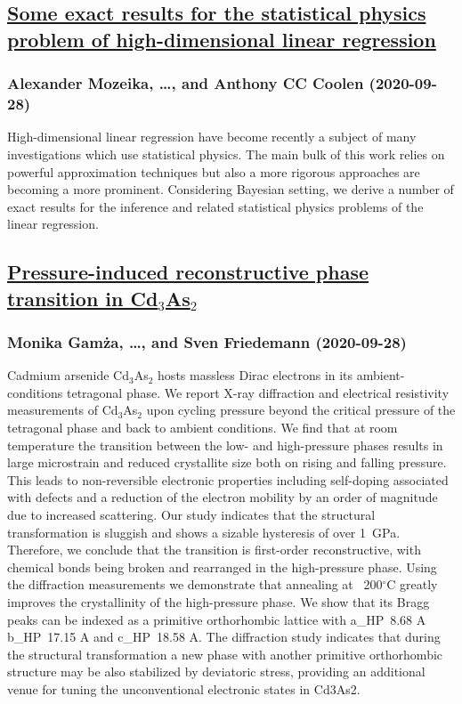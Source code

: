 \subsection*{\href{http://arxiv.org/abs/2009.13229v1}{Some exact results for the statistical physics problem of  high-dimensional linear regression}}
\subsubsection*{Alexander Mozeika, \dots, and Anthony CC Coolen (2020-09-28)}
High-dimensional linear regression have become recently a subject of many
investigations which use statistical physics. The main bulk of this work relies
on powerful approximation techniques but also a more rigorous approaches are
becoming a more prominent. Considering Bayesian setting, we derive a number of
exact results for the inference and related statistical physics problems of the
linear regression.

\subsection*{\href{http://arxiv.org/abs/2009.13228v1}{Pressure-induced reconstructive phase transition in Cd$_3$As$_2$}}
\subsubsection*{Monika Gamża, \dots, and Sven Friedemann (2020-09-28)}
Cadmium arsenide Cd$_3$As$_2$ hosts massless Dirac electrons in its
ambient-conditions tetragonal phase. We report X-ray diffraction and electrical
resistivity measurements of Cd$_3$As$_2$ upon cycling pressure beyond the
critical pressure of the tetragonal phase and back to ambient conditions. We
find that at room temperature the transition between the low- and high-pressure
phases results in large microstrain and reduced crystallite size both on rising
and falling pressure. This leads to non-reversible electronic properties
including self-doping associated with defects and a reduction of the electron
mobility by an order of magnitude due to increased scattering. Our study
indicates that the structural transformation is sluggish and shows a sizable
hysteresis of over 1~GPa. Therefore, we conclude that the transition is
first-order reconstructive, with chemical bonds being broken and rearranged in
the high-pressure phase. Using the diffraction measurements we demonstrate that
annealing at ~200$^\circ$C greatly improves the crystallinity of the
high-pressure phase. We show that its Bragg peaks can be indexed as a primitive
orthorhombic lattice with a\_HP~8.68 A b\_HP~17.15 A and c\_HP~18.58 A. The
diffraction study indicates that during the structural transformation a new
phase with another primitive orthorhombic structure may be also stabilized by
deviatoric stress, providing an additional venue for tuning the unconventional
electronic states in Cd3As2.

